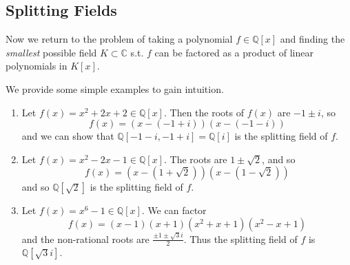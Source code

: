 \subsection{Splitting Fields}

  Now we return to the problem of taking a polynomial $f \in \mathbb{Q}[x]$ and finding the \textit{smallest} possible field $K \subset \mathbb{C}$ s.t. $f$ can be factored as a product of linear polynomials in $K[x]$. 

  \begin{example}
    We provide some simple examples to gain intuition. 
    \begin{enumerate}
      \item Let $f(x) = x^2 + 2x + 2 \in \mathbb{Q}[x]$. Then the roots of $f(x)$ are $-1 \pm i$, so 
      \begin{equation}
        f(x) = (x - (-1 + i)) (x - (-1 - i)) 
      \end{equation}
      and we can show that $\mathbb{Q}[-1 - i, -1+i] = \mathbb{Q}[i]$ is the splitting field of $f$. 

      \item Let $f(x) = x^2 - 2x - 1 \in \mathbb{Q}[x]$. The roots are $1 \pm \sqrt{2}$, and so 
      \begin{equation}
        f(x) = (x - (1 + \sqrt{2})) (x - (1 - \sqrt{2}))
      \end{equation}
      and so $\mathbb{Q}[\sqrt{2}]$ is the splitting field of $f$. 

      \item Let $f(x) = x^6 - 1 \in \mathbb{Q}[x]$. We can factor 
        \begin{equation}
          f(x) = (x-1) (x + 1) (x^2 + x + 1) (x^2 - x + 1)
        \end{equation} 
        and the non-rational roots are $\frac{\pm 1 \pm \sqrt{3} i}{2}$. Thus the splitting field of $f$ is $\mathbb{Q}[\sqrt{3} i]$. 
    \end{enumerate}
  \end{example}

